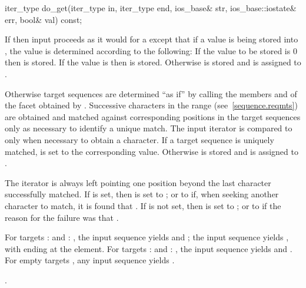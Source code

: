 %
\begin{itemdecl}
iter_type do_get(iter_type in, iter_type end, ios_base& str,
                 ios_base::iostate& err, bool& val) const;
\end{itemdecl}

\begin{itemdescr}
\pnum
\effects
If 
then input proceeds as it would for a 
except that if a value is being stored into ,
the value is determined according to the following:
If the value to be stored is 0 then  is stored.
If the value is  then  is stored.
Otherwise  is stored and
 is assigned to .

\pnum
Otherwise target sequences are determined ``as if'' by
calling the members  and  of
the facet obtained by .
Successive characters in the range  (see~\ref{sequence.reqmts})
are obtained and matched against
corresponding positions in the target sequences
only as necessary to identify a unique match.
The input iterator  is compared to 
only when necessary to obtain a character.
If a target sequence is uniquely matched,
 is set to the corresponding value.
Otherwise  is stored and
 is assigned to .

\pnum
The  iterator is always left pointing one position beyond
the last character successfully matched.
If  is set, then  is set to ;
or to  if,
when seeking another character to match,
it is found that .
If  is not set, then  is set to ;
or to 
if the reason for the failure was that .
\begin{example}
For targets :  and : ,
the input sequence  yields
 and ;
the input sequence  yields
, with  ending at the  element.
For targets :  and : ,
the input sequence  yields
 and .
For empty targets ,
any input sequence yields .
\end{example}

\pnum
\returns
{}.
\end{itemdescr}


